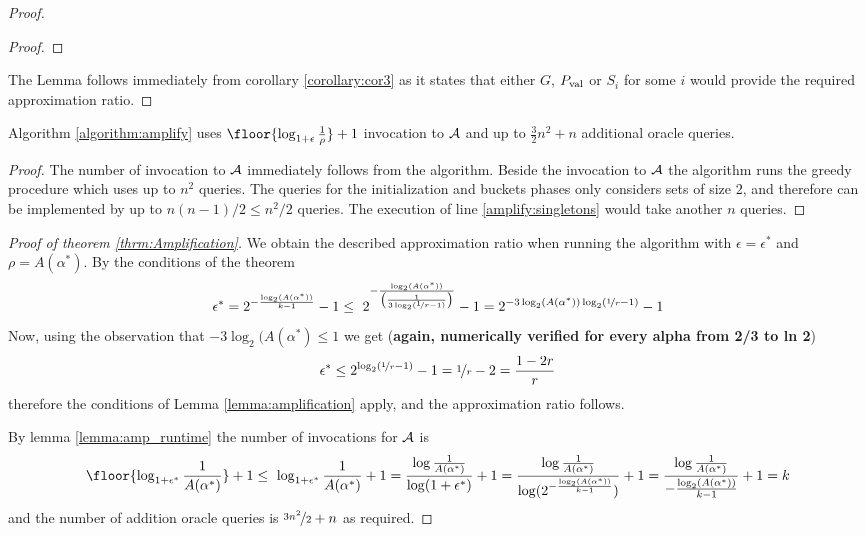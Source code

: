 \begin{proof}
\begin{proof}
		
	\end{proof}
The Lemma follows immediately from corollary \ref{corollary:cor3} as it states 
that either $G$, $P_{\text{val}}$ or $S_i$ for some $i$ would provide the required approximation 
ratio. 
\end{proof}

\begin{lemma}
	\label{lemma:amp_runtime}
Algorithm \ref{algorithm:amplify} uses $\floor{\log_{1+\epsilon} \frac{1}{\rho}}+1$ 
	invocation to $\mathcal{A}$ and up to $\frac{3}{2} n ^2+n$ additional oracle queries.
 \end{lemma}
\begin{proof}
	The number of invocation to $\mathcal{A}$ immediately follows from the algorithm. 
	Beside the invocation to $\mathcal{A}$ the algorithm runs the greedy procedure 
	which uses up to $n^2$ queries. The queries for the initialization and
	buckets phases only considers sets of size $2$, and therefore can be 
	implemented by up to $n(n-1)/2\leq n^2/2$ queries. The execution 
	of line \ref{amplify:singletons} would take another $n$ queries.
	\end{proof}



\begin{proof}[Proof of theorem \ref{thrm:Amplification}]
	
	We obtain the described approximation ratio when running the algorithm
	with $\epsilon = \epsilon^*$ and $\rho = A(\alpha^*)$. 
	By the conditions of the theorem
	$$\epsilon^* = 2 ^{-\frac{\log_2 (A(\alpha^*))}{k-1}} -1 \leq \
	2 ^{-\frac{ \log_2(A(\alpha^*))}{  \left(\frac{1}{3\log_2(\nicefrac[]{1}{r}-1)} \right) }} -1  = 2 ^{- 3 \log_2(A(\alpha^*))\log_2(\nicefrac[]{1}{r}-1) } -1$$
	Now, using the observation that $ -3 \log_2(A(\alpha^*)\leq 1$ we get
	({\bf again, numerically verified for every alpha from 2/3 to ln 2})
	$$\epsilon^* \leq 
	2^{\log_2(\nicefrac[]{1}{r}-1)} -1 = \nicefrac[]{1}{r}-2 = \frac{1-2r}{r} $$
	therefore the conditions of Lemma \ref{lemma:amplification} apply, 
	and the approximation ratio follows. 
	
	By lemma \ref{lemma:amp_runtime} the number of invocations for $\mathcal{A}$ 
	is 
	$$\floor{\log_{1+\epsilon^*} \frac{1}{A(\alpha^*)}}+1 \leq \
	\log_{1+\epsilon^*} \frac{1}{A(\alpha^*)} +1 =
	\frac{\log \frac{1}{A(\alpha^*)}} {\log(1+\epsilon^*)} +1 
	= \frac{\log \frac{1}{A(\alpha^*)}} {\log(2 ^{-\frac{\log_2 (A(\alpha^*))}{k-1}} )} +1 
	= \frac{\log \frac{1}{A(\alpha^*)}} {-\frac{\log_2 (A(\alpha^*))}{k-1}} +1
	= k$$
	and the number of addition oracle queries is $\nicefrac[]{3n^2}{2} + n $ 
	as required.
	
\end{proof}

